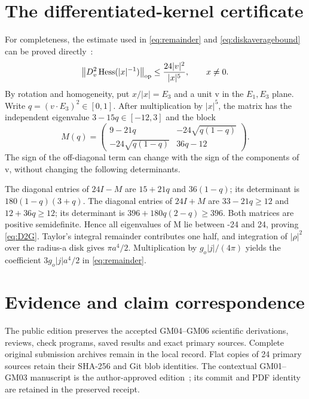 \section{The differentiated-kernel certificate}\label{app:kernel}
For completeness, the estimate used in \eqref{eq:remainder} and \eqref{eq:diskaveragebound} can be proved directly~\cite[section 3]{GM04}:
\begin{equation}\label{eq:D2G}
\left\lVert D_v^2\operatorname{Hess}(|x|^{-1})\right\rVert_{\rm op}\le\frac{24|v|^2}{|x|^5},
\qquad x\ne0.
\end{equation}
By rotation and homogeneity, put \(x/|x|=E_3\) and a unit v in the \(E_1,E_3\) plane. Write \(q=(v\cdot E_3)^2\in[0,1]\). After multiplication by \(|x|^5\), the matrix has the independent eigenvalue \(3-15q\in[-12,3]\) and the block
\begin{equation}\label{eq:block}
M(q)=
\begin{pmatrix}
9-21q&-24\sqrt{q(1-q)}\\
-24\sqrt{q(1-q)}&36q-12
\end{pmatrix}.
\end{equation}
The sign of the off-diagonal term can change with the sign of the components of v, without changing the following determinants.

The diagonal entries of \(24I-M\) are \(15+21q\) and \(36(1-q)\); its determinant is \(180(1-q)(3+q)\). The diagonal entries of \(24I+M\) are \(33-21q\ge12\) and \(12+36q\ge12\); its determinant is \(396+180q(2-q)\ge396\). Both matrices are positive semidefinite. Hence all eigenvalues of M lie between -24 and 24, proving \eqref{eq:D2G}. Taylor's integral remainder contributes one half, and integration of \(|\rho|^2\) over the radius-a disk gives \(\pi a^4/2\). Multiplication by \(g_o|j|/(4\pi)\) yields the coefficient \(3g_o|j|a^4/2\) in \eqref{eq:remainder}.

\section{Evidence and claim correspondence}\label{app:evidence}
The public edition preserves the accepted GM04--GM06 scientific derivations, reviews, check programs, saved results and exact primary sources. Complete original submission archives remain in the local record. Flat copies of 24 primary sources retain their SHA-256 and Git blob identities. The contextual GM01--GM03 manuscript is the author-approved edition~\cite{GM123}; its commit and PDF identity are retained in the preserved receipt.


